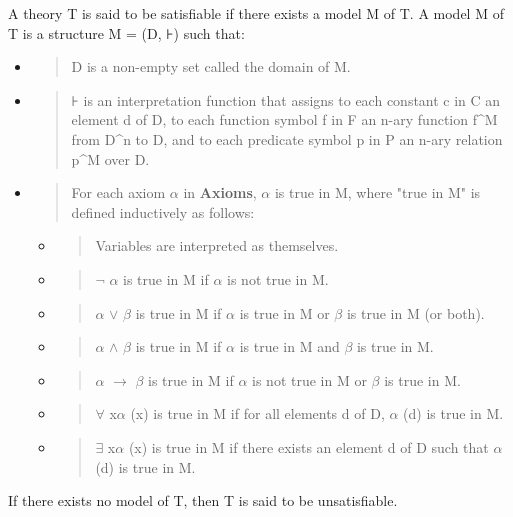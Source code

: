 A theory T is said to be satisfiable if there exists a model M of T. A
model M of T is a structure M = (D, ⊦) such that:

\begin{itemize}
\item
  \begin{quote}
  D is a non-empty set called the domain of M.
  \end{quote}
\item
  \begin{quote}
  ⊦ is an interpretation function that assigns to each constant c in C
  an element d of D, to each function symbol f in F an n-ary function
  f\^{}M from D\^{}n to D, and to each predicate symbol p in P an n-ary
  relation p\^{}M over D.
  \end{quote}
\item
  \begin{quote}
  For each axiom $\alpha$  in \textbf{Axioms}, $\alpha$  is true in M, where "true in M"
  is defined inductively as follows:
  \end{quote}

  \begin{itemize}
  \item
    \begin{quote}
    Variables are interpreted as themselves.
    \end{quote}
  \item
    \begin{quote}
    $\neg$ $\alpha$  is true in M if $\alpha$  is not true in M.
    \end{quote}
  \item
    \begin{quote}
    $\alpha$  $\lor$  $\beta$  is true in M if $\alpha$  is true in M or $\beta$  is true in M (or both).
    \end{quote}
  \item
    \begin{quote}
    $\alpha$  $\land$  $\beta$  is true in M if $\alpha$  is true in M and $\beta$  is true in M.
    \end{quote}
  \item
    \begin{quote}
    $\alpha$  $\to$  $\beta$  is true in M if $\alpha$  is not true in M or $\beta$  is true in M.
    \end{quote}
  \item
    \begin{quote}
    $\forall$ x$\alpha$ (x) is true in M if for all elements d of D, $\alpha$ (d) is true in M.
    \end{quote}
  \item
    \begin{quote}
    $\exists$ x$\alpha$ (x) is true in M if there exists an element d of D such that $\alpha$ (d)
    is true in M.
    \end{quote}
  \end{itemize}
\end{itemize}

If there exists no model of T, then T is said to be unsatisfiable.


